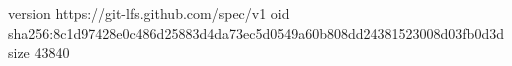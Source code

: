 version https://git-lfs.github.com/spec/v1
oid sha256:8c1d97428e0c486d25883d4da73ec5d0549a60b808dd24381523008d03fb0d3d
size 43840
